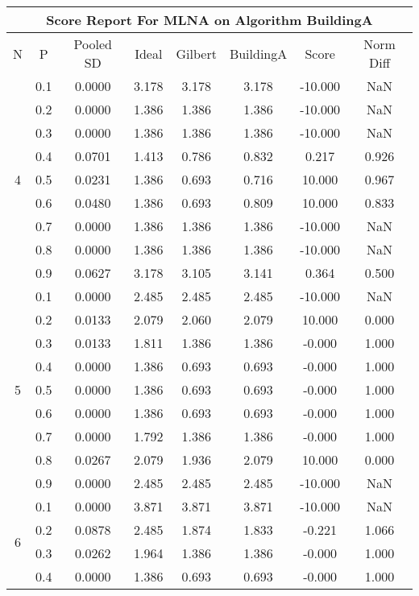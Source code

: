 \documentclass[11pt,a4paper]{report}
\begin{document}
\begin{longtable}{ | c | c || c | c | c | c | c | c | }
\hline
\multicolumn{8}{|c|}{ Score Report For MLNA on Algorithm BuildingA} \\
\hline
N & P & Pooled SD &  Ideal &  Gilbert & BuildingA  & Score & Norm Diff \\
 \hline
 \hline
 \endhead
\multirow{9}{*}{4} & 0.1 & 0.0000 & 3.178 & 3.178 & 3.178 & -10.000 & NaN \\
 & 0.2 & 0.0000 & 1.386 & 1.386 & 1.386 & -10.000 & NaN \\
 & 0.3 & 0.0000 & 1.386 & 1.386 & 1.386 & -10.000 & NaN \\
 & 0.4 & 0.0701 & 1.413 & 0.786 & 0.832 & 0.217 & 0.926 \\
 & 0.5 & 0.0231 & 1.386 & 0.693 & 0.716 & 10.000 & 0.967 \\
 & 0.6 & 0.0480 & 1.386 & 0.693 & 0.809 & 10.000 & 0.833 \\
 & 0.7 & 0.0000 & 1.386 & 1.386 & 1.386 & -10.000 & NaN \\
 & 0.8 & 0.0000 & 1.386 & 1.386 & 1.386 & -10.000 & NaN \\
 & 0.9 & 0.0627 & 3.178 & 3.105 & 3.141 & 0.364 & 0.500 \\
 \hline
\multirow{9}{*}{5} & 0.1 & 0.0000 & 2.485 & 2.485 & 2.485 & -10.000 & NaN \\
 & 0.2 & 0.0133 & 2.079 & 2.060 & 2.079 & 10.000 & 0.000 \\
 & 0.3 & 0.0133 & 1.811 & 1.386 & 1.386 & -0.000 & 1.000 \\
 & 0.4 & 0.0000 & 1.386 & 0.693 & 0.693 & -0.000 & 1.000 \\
 & 0.5 & 0.0000 & 1.386 & 0.693 & 0.693 & -0.000 & 1.000 \\
 & 0.6 & 0.0000 & 1.386 & 0.693 & 0.693 & -0.000 & 1.000 \\
 & 0.7 & 0.0000 & 1.792 & 1.386 & 1.386 & -0.000 & 1.000 \\
 & 0.8 & 0.0267 & 2.079 & 1.936 & 2.079 & 10.000 & 0.000 \\
 & 0.9 & 0.0000 & 2.485 & 2.485 & 2.485 & -10.000 & NaN \\
 \hline
\multirow{9}{*}{6} & 0.1 & 0.0000 & 3.871 & 3.871 & 3.871 & -10.000 & NaN \\
 & 0.2 & 0.0878 & 2.485 & 1.874 & 1.833 & -0.221 & 1.066 \\
 & 0.3 & 0.0262 & 1.964 & 1.386 & 1.386 & -0.000 & 1.000 \\
 & 0.4 & 0.0000 & 1.386 & 0.693 & 0.693 & -0.000 & 1.000 \\

\end{longtable}
\end{document}
